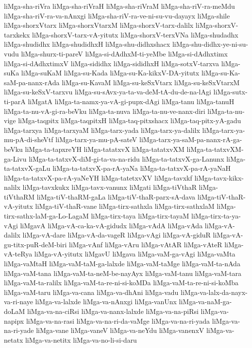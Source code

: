 {liMga-sha-riVra
liMga-sha-riVraH
liMga-sha-riVraM
liMga-sha-riV-ra-meMdu
liMga-sha-riV-ra-va-nAnxgi
liMga-sha-riV-ra-ve-ni-su-vu-dayayx
liMga-shile
liMga-shorxVtarx
liMga-shorxVtarxM
liMga-shorxV-tarx-dalilx
liMga-shorxV-tarxkekx
liMga-shorxV-tarx-vA-yitutx
liMga-shorxV-terxVNa
liMga-shudadhx
liMga-shudidhx
liMga-shudidhxH
liMga-shu-didhxshacx
liMga-shu-didhx-ye-ni-su-vudu
liMga-shurx-ti-pareV
liMga-si-dAdhxM-ti-yeMbe
liMga-si-dAdhxtimx
liMga-si-dAdhxtimxV
liMga-sididhx
liMga-sididhxH
liMga-sotxV-tarxva
liMga-suKa
liMga-suKaM
liMga-su-Kada
liMga-su-Ka-kikxV-DA-yitutx
liMga-su-Ka-saM-pa-nanx-rAda
liMga-su-KavaM
liMga-su-keSxVtarx
liMga-su-keSxVtarxM
liMga-su-keSxV-tarxvu
liMga-su-sAvx-ya-ta-va-deM-tA-du-de-na-lAgi
liMga-sutx-ti-parA
liMgatA
liMga-ta-namx-ya-vA-gi-pupx-dAgi
liMga-tanu
liMga-tanuH
liMga-ta-nu-vA-gi-ra-beVku
liMga-ta-nuva
liMga-ta-nu-ve-nanx-diri
liMga-ta-nu-vige
liMga-taqpitx
liMga-taqpitxH
liMga-taq-pitxshacx
liMga-taq-pitx-yA-gadu
liMga-tarxya
liMga-tarxyaM
liMga-tarx-yada
liMga-tarx-ya-dalilx
liMga-tarx-ya-mu-pA-di-sheVtf
liMga-tarx-ya-mu-pA-sateV
liMga-tarx-ya-saM-pa-nanx-rA-ga-beVku
liMga-ta-tapxreYH
liMga-tatatxvX
liMga-tatatxvXM
liMga-ta-tatxvXM-ga-Livu
liMga-ta-tatxvX-diM-gi-ta-va-na-ridu
liMga-ta-tatxvX-ga-Lanunx
liMga-ta-tatxvX-gaLu
liMga-ta-tatxvX-pa-rA-yaNa
liMga-ta-tatxvX-pa-rA-yaNaH
liMga-ta-tatxvX-pa-rA-yaNeYH
liMga-tatetxvXV
liMga-tavxkf
liMga-tavx-kikx-nalilx
liMga-tavxkukx
liMga-tavx-vanunx
liMgati
liMga-tiVthaR
liMga-tiVthaRM
liMga-tiV-thaRM-gaLa
liMga-tiV-thaR-parx-sA-dava
liMga-tiV-thaR-vA-yitutx
liMga-tiV-thaR-vane
liMga-tirx-sathxla
liMga-tirx-sathxlaM
liMga-tirx-sathx-laM-ga-Lo-LagaM
liMga-tirx-taya
liMga-tirx-tayaM
liMga-tirx-ta-ya-vAgi
liMgavA
liMga-vA-ca-ka-vA-gidudx
liMga-vAdA
liMga-vAda
liMga-vA-dalilx
liMga-vA-dare
liMga-vA-da-vageR
liMga-vAgi
liMga-vA-giduR
liMga-vA-gu-titx-puR-deM-biri
liMga-vAnf
liMga-vAru
liMga-vAtAR
liMga-vAteR
liMga-vA-teRya
liMga-vA-yitutx
liMgavU
liMgava
liMga-vaM-ga-vAgi
liMga-vaMta
liMga-vaMtaH
liMga-vaM-taM-ga-lalxde
liMga-vaM-taMge
liMga-vaM-ta-nAda
liMga-vaM-tana
liMga-vaM-ta-neM-be-nayAyx
liMga-vaM-tanu
liMga-vaM-tara
liMga-vaM-ta-ralilx
liMga-vaM-ta-re-ni-si-koMDa
liMga-vaM-ta-re-ni-si-koMba
liMga-vaM-taru
liMga-va-cana
liMga-va-dhAni
liMga-vadu
liMga-va-lalx-da-nayx-va-ri-naye
liMga-va-lalxde
liMga-va-nAnxgi
liMga-vanUnx
liMga-va-naM-ga-doLaM
liMga-va-na-ciRsi
liMga-va-nanx-lalxde
liMga-va-na-piRsi
liMga-va-napipx
liMga-va-na-rasi
liMga-va-na-ri-da-vaMge
liMga-va-na-ri-yada
liMga-va-na-ri-yade
liMga-vane
liMga-vaneV
liMga-va-neYdu
liMga-vanenxV
liMga-va-netatx
liMga-va-netitx
liMga-va-no-li-si-daru
}
